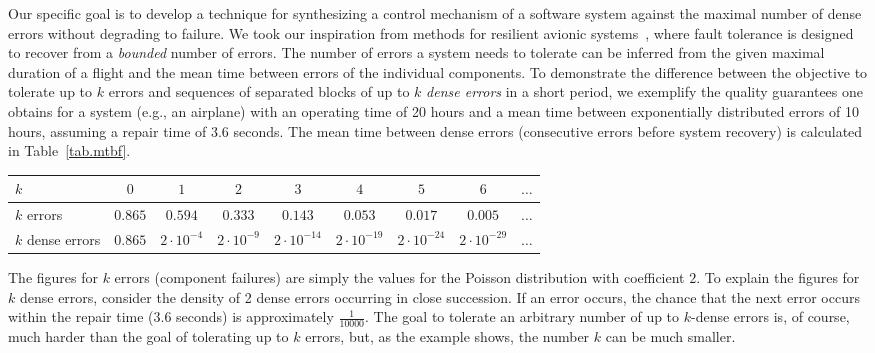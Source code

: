\documentclass[times,10pt,twocolumn]{article}
\begin{document}
Our specific goal \label{reply1.grammar.inco.specific.goal}
is to develop a technique for synthesizing a
control mechanism of a software system against the maximal number of dense errors 
without degrading to failure.
We \label{reply2.bounded} 
took our inspiration from methods 
for resilient avionic systems~\cite{Rushby92}, 
where fault tolerance is designed to recover from a \emph{bounded} number of errors.
The number of errors a system needs to tolerate can be inferred from the given maximal duration of a flight and the mean time between errors of the individual components.
To demonstrate the difference between the objective to tolerate up 
to $k$ errors and sequences of separated blocks of up to $k$ {\em dense errors}  \label{reply2.scarce} 
in a short period, we exemplify the quality guarantees 
one obtains for a system (e.g., an airplane) 
with an operating time of 20 hours and a mean time between 
exponentially distributed errors of 10 hours, 
assuming a repair time of 3.6 seconds.
The mean time between dense errors (consecutive errors before system recovery) 
is calculated in Table~\ref{tab.mtbf}.  
\begin{table*}
\begin{center}
\begin{tabular}{l||c|c|c|c|c|c|c|c}\hline 
$k$              & $0$     & $1$     &    $2$   &  $3$  & $4$ & $5$ & $6$ & $\ldots$ \\\hline 
$k$ errors       & $0.865$ & $0.594$ & $0.333$ & $0.143$ & $0.053$ & $0.017$ & $0.005$ & $\ldots$ \\
$k$ dense errors & $0.865$ & $2 \cdot 10^{-4}$ & $2 \cdot 10^{-9}$ & $2 \cdot 10^{-14}$ & $2\cdot 10^{-19}$ & $2\cdot 10^{-24}$ & $2\cdot 10^{-29}$ & $\ldots$ 
\\ \hline 
\end{tabular}
\end{center}
\caption{Probabilities of $k$ dense errors} 
\label{tab.mtbf} 
\end{table*} 
The figures for $k$ errors (component failures) are simply the values 
for the Poisson distribution with coefficient $2$.
To explain the figures for $k$ dense errors, 
consider the density of 2 dense errors occurring in close succession.
If an error occurs, the chance that the next error occurs 
within the repair time (3.6 seconds) is approximately $\frac{1}{10000}$.
The goal to tolerate an arbitrary number of up to $k$-dense errors is, of course, 
much harder than the goal of tolerating up to $k$ errors, but, 
as the example shows, the number $k$ can be much smaller.   
\end{document}
